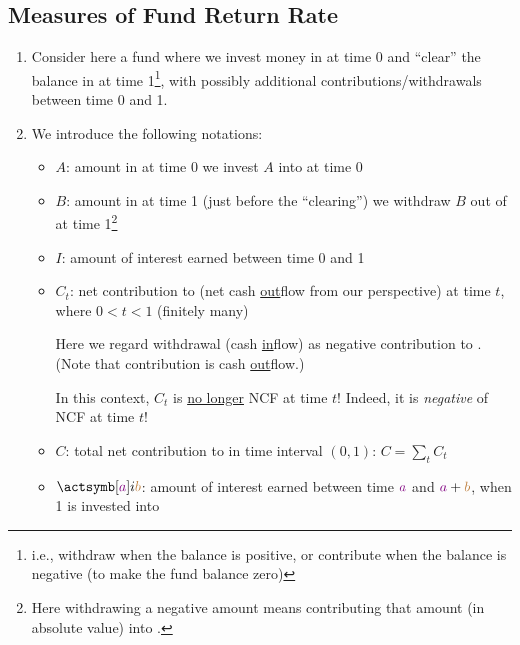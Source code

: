 \subsection{Measures of Fund Return Rate}
\label{subsect:fund-return}
\begin{enumerate}
\item Consider here a fund  where we invest money
 in  at time 0 and ``clear'' the balance
in  at time 1\footnote{i.e., withdraw 
when the balance is positive, or contribute  when the
balance is negative (to make the fund balance zero)}, with possibly additional
contributions/withdrawals between time 0 and 1.

\item We introduce the following notations:
\begin{itemize}
\item \(A\): amount in  at time 0  we invest \(A\) into  at time 0
\item \(B\): amount in  at time 1 (just before the
``clearing'')  we withdraw \(B\) out of 
at time 1\footnote{Here withdrawing a negative amount means contributing that
amount (in absolute value) into .}
\item \(I\): amount of interest earned between time 0 and 1
\item \(C_t\): net contribution to  (net cash
\underline{out}flow from our perspective) at time \(t\), where \(0<t<1\) (finitely many)
\begin{note}
Here we regard withdrawal (cash \underline{in}flow) as negative contribution to
. (Note that contribution is cash \underline{out}flow.)
\end{note}
\begin{warning}
In this context, \(C_t\) is \underline{no longer} NCF at time \(t\)! Indeed, it
is \emph{negative} of NCF at time \(t\)!
\end{warning}
\item \(C\): total net contribution to  in time interval
\((0,1)\): \(C=\sum_{t}^{}C_t\)
\item \(\actsymb[{\color{violet}a}]{i}{{\color{brown}b}}\): amount of interest
earned between time \({\color{violet}a}\) and
\({\color{violet}a}+{\color{brown}b}\), when 1 is invested into 

\end{itemize}
\end{enumerate}
